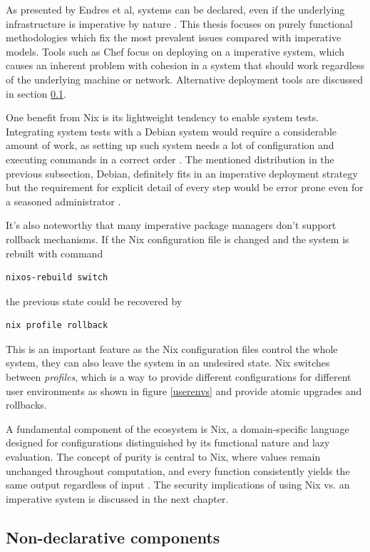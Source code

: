As presented by Endres et al, systems can be declared, even if the
underlying infrastructure is imperative by nature
\cite{endres2017declarative}. This thesis focuses on purely functional
methodologies which fix the most prevalent issues compared with
imperative models. Tools such as Chef focus on deploying on a
imperative system, which causes an inherent problem with cohesion in a
system that should work regardless of the underlying machine or
network. Alternative deployment tools are discussed in section
\ref{nondeclarative}.

One benefit from Nix is its lightweight tendency to enable system
tests. Integrating system tests with a Debian system would require a
considerable amount of work, as setting up such system needs a lot of
configuration and executing commands in a correct order
\cite{van2010automating}. The mentioned distribution in the
previous subsection, Debian, definitely fits in an imperative
deployment strategy but the requirement for explicit detail of every
step would be error prone even for a seasoned administrator
\cite{breitenbucher2017declarative}.

It's also noteworthy that many imperative package managers don't
support rollback mechanisms. If the Nix configuration file is changed
and the system is rebuilt with command
\begin{lstlisting}
nixos-rebuild switch
\end{lstlisting}
the previous state could be recovered by
\begin{lstlisting}
nix profile rollback
\end{lstlisting}
This is an important feature as the Nix configuration files control
the whole system, they can also leave the system in an undesired
state. Nix switches between \textit{profiles}, which is a way to
provide different configurations for different user environments as
shown in figure \ref{userenvs} and provide atomic upgrades and
rollbacks. \cite{nixosNixOSManual}

A fundamental component of the ecosystem is Nix, a domain-specific
language designed for configurations distinguished by its functional
nature and lazy evaluation. The concept of purity is central to Nix,
where values remain unchanged throughout computation, and every
function consistently yields the same output regardless of input
\cite{dolstra2013charon}. The security implications of using Nix
vs. an imperative system is discussed in the next chapter.

\subsection{Non-declarative components} \label{nondeclarative}

